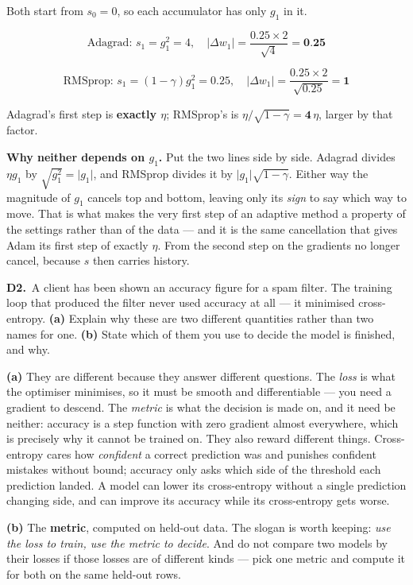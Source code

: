 \documentclass[10pt,a4paper]{article}
\newcommand{\sol}[1]{\textbf{#1}}
\begin{document}
\vspace{2pt}

Both start from $s_0 = 0$, so each accumulator has only $g_1$ in it.

\[ \text{Adagrad: } s_1 = g_1^2 = 4, \quad \lvert \Delta w_1 \rvert = \frac{0.25 \times 2}{\sqrt{4}} = \sol{0.25} \]

\[ \text{RMSprop: } s_1 = (1-\gamma) g_1^2 = 0.25, \quad \lvert \Delta w_1 \rvert = \frac{0.25 \times 2}{\sqrt{0.25}} = \sol{1} \]

Adagrad's first step is \sol{exactly $\eta$}; RMSprop's is $\eta/\sqrt{1-\gamma} = \sol{4}\,\eta$, larger by that factor.

\vspace{2pt}

\textbf{Why neither depends on $g_1$.} Put the two lines side by side. Adagrad divides $\eta g_1$ by $\sqrt{g_1^2} = \lvert g_1 \rvert$, and RMSprop divides it by $\lvert g_1 \rvert \sqrt{1-\gamma}$. Either way the magnitude of $g_1$ cancels top and bottom, leaving only its \emph{sign} to say which way to move. That is what makes the very first step of an adaptive method a property of the settings rather than of the data --- and it is the same cancellation that gives Adam its first step of exactly $\eta$. From the second step on the gradients no longer cancel, because $s$ then carries history.

\vspace{6pt}

\textbf{D2.}\ A client has been shown an accuracy figure for a spam filter. The training loop that produced the filter never used accuracy at all --- it minimised cross-entropy. \textbf{(a)} Explain why these are two different quantities rather than two names for one. \textbf{(b)} State which of them you use to decide the model is finished, and why.

\vspace{2pt}

\textbf{(a)} They are different because they answer different questions. The \emph{loss} is what the optimiser minimises, so it must be smooth and differentiable --- you need a gradient to descend. The \emph{metric} is what the decision is made on, and it need be neither: accuracy is a step function with zero gradient almost everywhere, which is precisely why it cannot be trained on. They also reward different things. Cross-entropy cares how \emph{confident} a correct prediction was and punishes confident mistakes without bound; accuracy only asks which side of the threshold each prediction landed. A model can lower its cross-entropy without a single prediction changing side, and can improve its accuracy while its cross-entropy gets worse.\par\vspace{1mm}\textbf{(b)} The \textbf{metric}, computed on held-out data. The slogan is worth keeping: \emph{use the loss to train, use the metric to decide}. And do not compare two models by their losses if those losses are of different kinds --- pick one metric and compute it for both on the same held-out rows.
\end{document}

